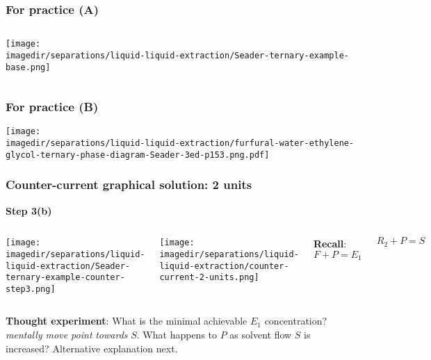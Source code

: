 \begin{frame}\frametitle{For practice (A)}
	\begin{columns}[t]
			\begin{center}
				\texttt{[image: \\imagedir/separations/liquid-liquid-extraction/Seader-ternary-example-base.png]}
			\end{center}
	\end{columns}
\end{frame}

\begin{frame}\frametitle{For practice (B)}
	\begin{center}
		\texttt{[image: \\imagedir/separations/liquid-liquid-extraction/furfural-water-ethylene-glycol-ternary-phase-diagram-Seader-3ed-p153.png.pdf]}
	\end{center}
\end{frame}

\begin{frame}\frametitle{Counter-current graphical solution: 2 units}
	\textbf{Step 3(b)}
	\begin{columns}[t]
			\begin{center}
				\texttt{[image: \\imagedir/separations/liquid-liquid-extraction/Seader-ternary-example-counter-step3.png]}
			\end{center}
			\begin{center}
				\texttt{[image: \\imagedir/separations/liquid-liquid-extraction/counter-current-2-units.png]}
			\end{center}
			\textbf{Recall}:
			\vspace{-10pt}
			\[	F + P = E_1 \]

			\[	R_2 + P = S \]
	\end{columns}
	\textbf{Thought experiment}: What is the minimal achievable $E_1$ concentration? \emph{mentally move point} {\color{myRed}{$M$}} \emph{towards} $S$. What happens to $P$ as solvent flow $S$ is increased?
	{\small Alternative explanation next.}
\end{frame}


